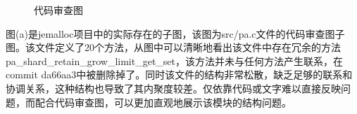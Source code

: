 \begin{figure}[!h]
    \setlength{\subfigcapskip}{-1bp}
    \centering
    \begin{minipage}{\textwidth}
    \centering
    \hspace{2em}
    \end{minipage}
    \centering
    \begin{minipage}{\textwidth}
    \centering
    \hspace{2em}
    \end{minipage}
    \vspace{0.2em}
    \caption{代码审查图} %
\end{figure}



图(a)是jemalloc项目中的实际存在的子图，该图为src/pa.c文件的代码审查图子图。该文件定义了20个方法，从图中可以清晰地看出该文件中存在冗余的方法pa\_shard\_retain\_grow\_limit\_get\_set，该方法并未与任何方法产生联系，在commit da66aa3中被删除掉了。同时该文件的结构非常松散，缺乏足够的联系和协调关系，这种结构也导致了其内聚度较差。仅依靠代码或文字难以直接反映问题，而配合代码审查图，可以更加直观地展示该模块的结构问题。

